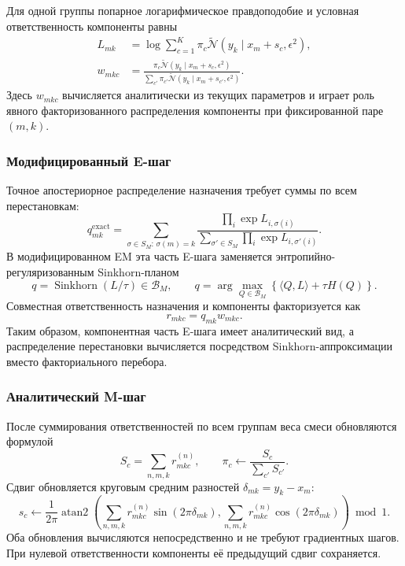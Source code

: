 Для одной группы попарное логарифмическое правдоподобие и условная ответственность
компоненты равны
\begin{align}
L_{mk}&=\log\sum_{c=1}^{K}\pi_c
\tilde{\mathcal{N}}(y_k\mid x_m+s_c,\epsilon^2),\\
w_{mkc}&=
\frac{\pi_c\tilde{\mathcal{N}}(y_k\mid x_m+s_c,\epsilon^2)}
{\sum_{c'}\pi_{c'}\tilde{\mathcal{N}}(y_k\mid x_m+s_{c'},\epsilon^2)}.
\label{eq:em-component-responsibility}
\end{align}
Здесь $w_{mkc}$ вычисляется аналитически из текущих параметров и играет роль явного
факторизованного распределения компоненты при фиксированной паре $(m,k)$.

\subsubsection{Модифицированный E-шаг}

Точное апостериорное распределение назначения требует суммы по всем перестановкам:
\begin{equation}
q^{\mathrm{exact}}_{mk}
=\sum_{\sigma\in S_M:\,\sigma(m)=k}
\frac{\prod_i\exp L_{i,\sigma(i)}}
{\sum_{\sigma'\in S_M}\prod_i\exp L_{i,\sigma'(i)}}.
\end{equation}
В модифицированном EM эта часть E-шага заменяется энтропийно-регуляризованным
Sinkhorn-планом
\begin{equation}
q=\operatorname{Sinkhorn}(L/\tau)\in\mathcal{B}_M,
\qquad
q=\arg\max_{Q\in\mathcal{B}_M}
\left\{\langle Q,L\rangle+\tau H(Q)\right\}.
\label{eq:em-e}
\end{equation}
Совместная ответственность назначения и компоненты факторизуется как
\begin{equation}
r_{mkc}=q_{mk}w_{mkc}.
\label{eq:em-joint-responsibility}
\end{equation}
Таким образом, компонентная часть E-шага имеет аналитический вид, а распределение
перестановки вычисляется посредством Sinkhorn-аппроксимации вместо факториального перебора.

\subsubsection{Аналитический M-шаг}

После суммирования ответственностей по всем группам веса смеси обновляются формулой
\begin{equation}
S_c=\sum_{n,m,k}r^{(n)}_{mkc},
\qquad
\pi_c\leftarrow\frac{S_c}{\sum_{c'}S_{c'}}.
\label{eq:em-m-pi}
\end{equation}
Сдвиг обновляется круговым средним разностей $\delta_{mk}=y_k-x_m$:
\begin{equation}
s_c\leftarrow\frac{1}{2\pi}\operatorname{atan2}\!\left(
\sum_{n,m,k}r^{(n)}_{mkc}\sin(2\pi\delta_{mk}),
\sum_{n,m,k}r^{(n)}_{mkc}\cos(2\pi\delta_{mk})
\right)\bmod1.
\label{eq:em-m-shift}
\end{equation}
Оба обновления вычисляются непосредственно и не требуют градиентных шагов. При нулевой
ответственности компоненты её предыдущий сдвиг сохраняется.

